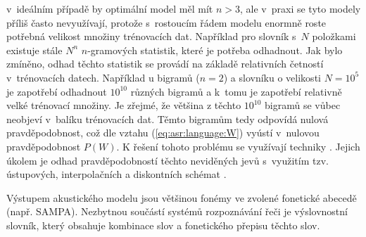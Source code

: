 \noindent v~ideálním případě by optimální model měl mít $n > 3$, ale v~praxi se tyto modely příliš často nevyužívají, protože s~rostoucím řádem modelu enormně roste potřebná velikost množiny trénovacích dat. Například pro slovník s~$N$ položkami existuje stále $N^{n}$ $n$-gramových statistik, které je potřeba odhadnout. Jak bylo zmíněno, odhad těchto statistik se provádí na základě relativních četností v~trénovacích datech. Například u bigramů ($n=2$) a slovníku o velikosti $N=10^{5}$ je zapotřebí odhadnout $10^{10}$ různých bigramů a  k~tomu je zapotřebí relativně velké trénovací množiny. Je zřejmé, že většina z těchto $10^{10}$ bigramů se vůbec neobjeví v~balíku trénovacích dat. Těmto  bigramům tedy odpovídá nulová pravděpodobnost, což dle vztahu (\ref{eq:asr:language:W}) vyústí v~nulovou pravděpodobnost $P\left(W\right)$. K řešení tohoto problému se využívají techniky . Jejich úkolem je odhad pravděpodobností těchto neviděných jevů s~využitím tzv. ústupových, interpolačních a diskontních schémat \cite{Psutka2006}.

Výstupem akustického modelu jsou většinou fonémy ve zvolené fonetické abecedě (např. SAMPA). Nezbytnou součástí systémů rozpoznávání řeči je výslovnostní slovník, který obsahuje kombinace slov a fonetického přepisu těchto slov.
